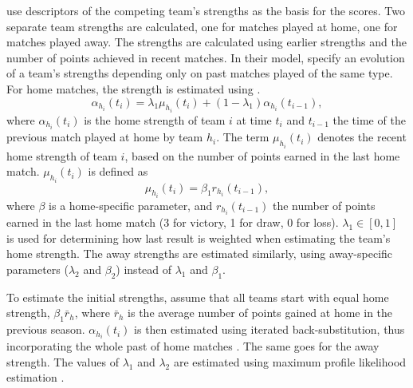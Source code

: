 \citet{bib:cattelan-varin-firth-2013} use descriptors of the competing team's strengths as the basis for the scores. Two separate team strengths are calculated, one for matches played at home, one for matches played away. The strengths are calculated using earlier strengths and the number of points achieved in recent matches. In their model, \citet{bib:cattelan-varin-firth-2013} specify an evolution of a team's strengths depending only on past matches played of the same type. For home matches, the strength is estimated using .
\begin{equation}
    \alpha_{h_{i}}(t_{i}) = \lambda_{1} \mu_{h_{i}}(t_{i}) + (1 - \lambda_{1}) \alpha_{h_{i}}(t_{i-1}),
    \label{eq:cattelan-varin-firth-home-strengths}
\end{equation}
where $\alpha_{h_{i}}(t_{i})$ is the home strength of team $i$ at time $t_{i}$ and $t_{i-1}$ the time of the previous match played at home by team $h_{i}$. The term $\mu_{h_{i}}(t_{i})$ denotes the recent home strength of team $i$, based on the number of points earned in the last home match. $\mu_{h_{i}}(t_{i})$ is defined as
\begin{equation*}
    \mu_{h_{i}}(t_{i}) = \beta_{1} r_{h_{i}}(t_{i-1}),
\end{equation*}
where $\beta$ is a home-specific parameter, and $r_{h_{i}}(t_{i-1})$ the number of points earned in the last home match (3 for victory, 1 for draw, 0 for loss). $\lambda_{1} \in [0, 1]$ is used for determining how last result is weighted when estimating the team's home strength. The away strengths are estimated similarly, using away-specific parameters ($\lambda_{2}$ and $\beta_{2}$) instead of $\lambda_{1}$ and $\beta_{1}$.

To estimate the initial strengths, \citet{bib:cattelan-varin-firth-2013} assume that all teams start with equal home strength, $\beta_{1} \bar{r}_{h}$, where $\bar{r}_{h}$ is the average number of points gained at home in the previous season. $\alpha_{h_{i}}(t_{i})$ is then estimated using iterated back-substitution, thus incorporating the whole past of home matches \citep{bib:cattelan-varin-firth-2013}. The same goes for the away strength. The values of $\lambda_{1}$ and $\lambda_{2}$ are estimated using maximum profile likelihood estimation \citep{bib:cattelan-varin-firth-2013}.

